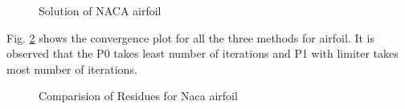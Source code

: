 \documentclass[12pt]{elsarticle}
\begin{document}
\begin{figure}[ht]
		\caption{Solution of NACA airfoil}
		\label{figure9}
	\end{figure}
	\clearpage
	
	Fig. \ref{figure10} shows the convergence plot for all the three methods for airfoil. It is observed that the P0 takes least number of iterations and P1 with limiter takes most number of iterations.
	
	\begin{figure}[ht]
		\centering
		\caption{Comparision of Residues for Naca airfoil}
		\label{figure10}
	\end{figure}
	\clearpage
	
\end{document}
